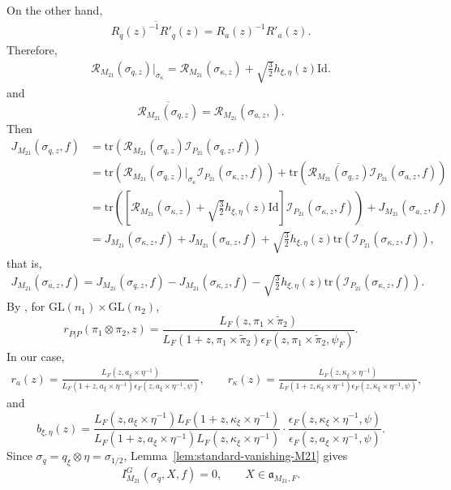 \documentclass[11pt]{amsart}
\newcommand{\GGL}{\mathrm{GL}}
\theoremstyle{definition}
\numberwithin{equation}{section}
\begin{document}
	On the other hand,
	\begin{align*}
		\overline{R_q(z)^{-1} R'_q(z)}=R_a(z)^{-1} R'_a(z).
	\end{align*}Therefore, 
	\begin{align*}
		\mathscr{R}_{M_{21}}(\sigma_{q,z})|_{\sigma_\kappa}= \mathscr{R}_{M_{21}}(\sigma_{\kappa,z}) + \sqrt{\frac{3}{2}}  h_{\xi,\eta}(z) \mathrm{Id}.
	\end{align*}and \[\overline{\mathscr{R}_{M_{21}}(\sigma_{q,z})} = \mathscr{R}_{M_{21}}(\sigma_{a,z},).\]
	Then 
	\begin{align*}
		J_{M_{21}}(\sigma_{q,z}, f) &= \mathrm{tr}\left( \mathscr{R}_{M_{21}}(\sigma_{q,z}) \mathscr{I}_{P_{21}}(\sigma_{q,z}, f) \right) \\
		&= \mathrm{tr}\left( \mathscr{R}_{M_{21}}(\sigma_{q,z}) |_{\sigma_\kappa} \mathscr{I}_{P_{21}}(\sigma_{\kappa,z}, f) \right) + \mathrm{tr}\left( \overline{\mathscr{R}_{M_{21}}(\sigma_{q,z}) } \mathscr{I}_{P_{21}}(\sigma_{a,z}, f) \right) \\
		&= \mathrm{tr}\left( \left[ \mathscr{R}_{M_{21}}(\sigma_{\kappa,z}) + \sqrt{\frac{3}{2}} h_{\xi,\eta}(z) \mathrm{Id} \right] \mathscr{I}_{P_{21}}(\sigma_{\kappa,z}, f) \right) + J_{M_{21}}(\sigma_{a,z}, f) \\
		&= J_{M_{21}}(\sigma_{\kappa,z}, f) + J_{M_{21}}(\sigma_{a,z}, f) + \sqrt{\frac{3}{2}} h_{\xi,\eta}(z) \mathrm{tr}\left( \mathscr{I}_{P_{21}}(\sigma_{\kappa,z}, f) \right),
	\end{align*}that is,
	\begin{align}\label{result}
		J_{M_{21}}(\sigma_{a,z}, f) =J_{M_{21}}(\sigma_{q,z}, f) -J_{M_{21}}(\sigma_{\kappa,z}, f) - \sqrt{\frac{3}{2}} h_{\xi,\eta}(z) \mathrm{tr}\left( \mathscr{I}_{P_{21}}(\sigma_{\kappa,z}, f) \right).
	\end{align}
	By \cite{MS04}, for \(\GGL(n_1)\times \GGL(n_2)\),
	$$
	r_{\overline{P}|P}(\pi_1 \otimes \pi_2, z) = \frac{L_F(z, \pi_1 \times \widetilde{\pi}_2)}{L_F(1 + z, \pi_1 \times \widetilde{\pi}_2)\epsilon_F(z, \pi_1 \times \widetilde{\pi}_2, \psi_F)}.
	$$
	In our case, $$
	\begin{gathered}
		r_a(z) = \frac{L_F(z, a_\xi \times \eta^{-1})}{L_F(1 + z, a_\xi \times \eta^{-1})\epsilon_F(z, a_\xi \times \eta^{-1}, \psi)},\qquad
		r_\kappa(z) = \frac{L_F(z, \kappa_\xi \times \eta^{-1})}{L_F(1 + z, \kappa_\xi \times \eta^{-1})\epsilon_F(z, \kappa_\xi \times \eta^{-1}, \psi)},
	\end{gathered}
	$$and 
	$$
	b_{\xi,\eta}(z) = \frac{L_F(z, a_\xi \times \eta^{-1})L_F(1 + z, \kappa_\xi \times \eta^{-1})}{L_F(1 + z, a_\xi \times \eta^{-1})L_F(z, \kappa_\xi \times \eta^{-1})} \cdot \frac{\epsilon_F(z, \kappa_\xi \times \eta^{-1}, \psi)}{\epsilon_F(z, a_\xi \times \eta^{-1}, \psi)}.
	$$
	Since \(\sigma_q=q_\xi\otimes\eta=\sigma_{1/2}\),
Lemma~\ref{lem:standard-vanishing-M21} gives
\[
I_{M_{21}}^G(\sigma_q,X,f)=0,
\qquad X\in\mathfrak a_{M_{21},F}.
\]
	
\end{document}
